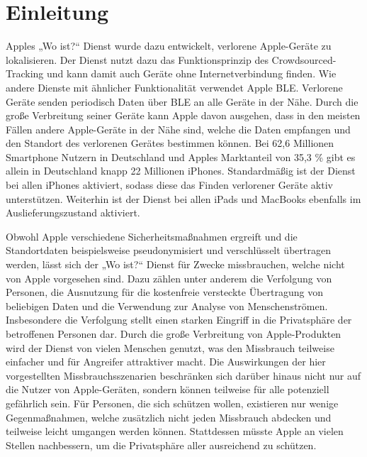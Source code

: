 
\section{Einleitung}

Apples „Wo ist?“ Dienst wurde dazu entwickelt, verlorene Apple-Geräte zu lokalisieren.
Der Dienst nutzt dazu das Funktionsprinzip des Crowdsourced-Tracking und kann damit auch Geräte ohne Internetverbindung finden.
Wie andere Dienste mit ähnlicher Funktionalität verwendet Apple \ac{BLE}.
Verlorene Geräte senden periodisch Daten über \ac{BLE} an alle Geräte in der Nähe.
Durch die große Verbreitung seiner Geräte kann Apple davon ausgehen, dass in den meisten Fällen andere Apple-Geräte in der Nähe sind, welche die Daten empfangen und den Standort des verlorenen Gerätes bestimmen können.
Bei 62,6 Millionen Smartphone Nutzern in Deutschland \cite{Statista_SmartphonesDeutschland} und Apples Marktanteil von 35,3 \% \cite{Statscounter_Marktanteil_iOS} gibt es allein in Deutschland knapp 22 Millionen iPhones.
Standardmäßig ist der Dienst bei allen iPhones aktiviert, sodass diese das Finden verlorener Geräte aktiv unterstützen.
Weiterhin ist der Dienst bei allen iPads und MacBooks ebenfalls im Auslieferungszustand aktiviert.


Obwohl Apple verschiedene Sicherheitsmaßnahmen ergreift und die Standortdaten beispielsweise pseudonymisiert und verschlüsselt übertragen werden, lässt sich der „Wo ist?“ Dienst für Zwecke missbrauchen, welche nicht von Apple vorgesehen sind.
Dazu zählen unter anderem die Verfolgung von Personen, die Ausnutzung für die kostenfreie versteckte Übertragung von beliebigen Daten und die Verwendung zur Analyse von Menschenströmen.
Insbesondere die Verfolgung stellt einen starken Eingriff in die Privatsphäre der betroffenen Personen dar.
Durch die große Verbreitung von Apple-Produkten wird der Dienst von vielen Menschen genutzt, was den Missbrauch teilweise einfacher und für Angreifer attraktiver macht.
Die Auswirkungen der hier vorgestellten Missbrauchsszenarien beschränken sich darüber hinaus nicht nur auf die Nutzer von Apple-Geräten, sondern können teilweise für alle potenziell gefährlich sein.
Für Personen, die sich schützen wollen, existieren nur wenige Gegenmaßnahmen, welche zusätzlich nicht jeden Missbrauch abdecken und teilweise leicht umgangen werden können.
Stattdessen müsste Apple an vielen Stellen nachbessern, um die Privatsphäre aller ausreichend zu schützen.


